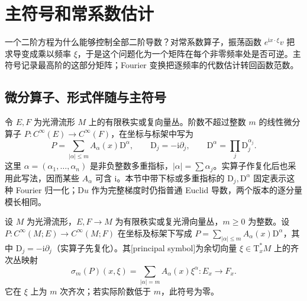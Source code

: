 
% 
% 

\section{主符号和常系数估计}
\label{g3:sec:1202}

一个二阶方程为什么能够控制全部二阶导数？对常系数算子，振荡函数 \(e^{\mathrm ix\cdot\xi}v\) 把求导变成乘以频率 \(\xi\)，于是这个问题化为一个矩阵在每个非零频率处是否可逆。主符号记录最高阶的这部分矩阵；Fourier 变换把逐频率的代数估计转回函数范数。

\subsection{微分算子、形式伴随与主符号}
\label{g3:subsec:1202:01}
令 \(E,F\) 为光滑流形 \(M\) 上的有限秩实或复向量丛。阶数不超过整数 \(m\) 的线性微分算子 \(P:C^\infty(E)\to C^\infty(F)\)，在坐标与标架中写为
\[
	P=\sum_{|\alpha|\le m}A_\alpha(x)\mathrm D^\alpha,
	\qquad \mathrm D_j=-\mathrm i\partial_j,
	\qquad \mathrm D^\alpha=\prod_j\mathrm D_j^{\alpha_j}.
\]
这里 \(\alpha=(\alpha_1,\ldots,\alpha_n)\) 是非负整数多重指标，\(|\alpha|=\sum\alpha_j\)。实算子作复化后也采用此写法，因而某些 \(A_\alpha\) 可含 \(\mathrm i\)。本节中带下标或多重指标的 \(\mathrm D_j,\mathrm D^\alpha\) 固定表示这种 Fourier 归一化；\(\mathrm Du\) 作为完整梯度时仍指普通 Euclid 导数，两个版本的逐分量模长相同。

\begin{definition}\label{g3:def:principal-symbol}
	设 \(M\) 为光滑流形，\(E,F\to M\) 为有限秩实或复光滑向量丛，\(m\ge0\) 为整数。设 \(P:C^\infty(M;E)\to C^\infty(M;F)\) 在坐标及标架下写成 \(P=\sum_{|\alpha|\le m}A_\alpha(x)\mathrm D^\alpha\)，其中 \(\mathrm D_j=-\mathrm i\partial_j\)（实算子先复化）。其[principal symbol]为余切向量 \(\xi\in\mathrm T_x^*M\) 上的齐次丛映射
	\[
		\sigma_m(P)(x,\xi)=\sum_{|\alpha|=m}A_\alpha(x)\xi^\alpha:E_x\longrightarrow F_x.
	\]
	它在 \(\xi\) 上为 \(m\) 次齐次；若实际阶数低于 \(m\)，此符号为零。
\end{definition}

